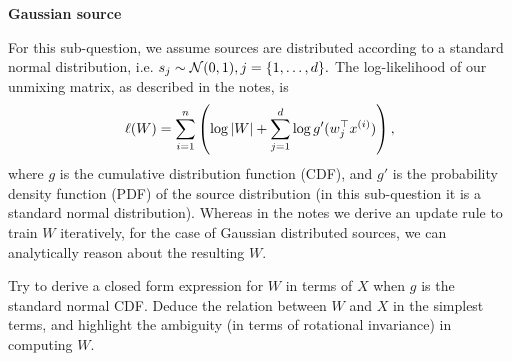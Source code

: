 \item {} \textbf{Gaussian source}

For this sub-question, we assume sources are distributed according to a standard normal distribution, i.e. $s_j \sim \mathcal{N}(0,1), j=\{1,\ldots,{d}\}.$
The log-likelihood of our unmixing matrix, as described in the notes, is
$$\ell(W) = \sum_{i=1}^{n}\left(\log|W| + \sum_{j=1}^{d} \log g'(w_j^{\top} x^{(i)})\right),$$
where $g$ is the cumulative distribution function (CDF), and $g'$ is the probability density function (PDF) of the source distribution (in this sub-question it is a standard normal distribution).
Whereas in the notes we derive an update rule to train $W$ iteratively, for the case of Gaussian distributed sources, we can analytically reason about the resulting $W$.

Try to derive a closed form expression for $W$ in terms of $X$ when $g$ is the standard normal CDF. Deduce the relation between $W$ and $X$ in the simplest terms, and highlight the ambiguity (in terms of rotational invariance) in computing $W$.
